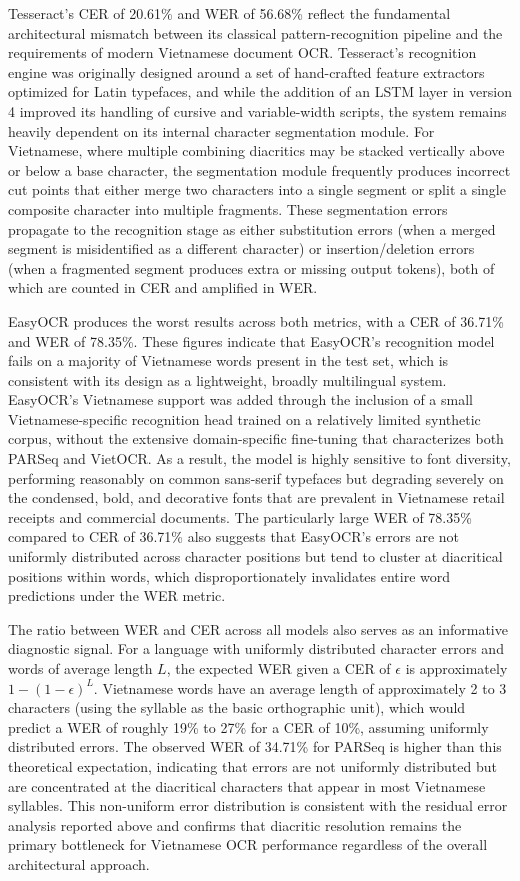 Tesseract's CER of 20.61\% and WER of 56.68\% reflect the fundamental architectural mismatch between its classical pattern-recognition pipeline and the requirements of modern Vietnamese document OCR. Tesseract's recognition engine was originally designed around a set of hand-crafted feature extractors optimized for Latin typefaces, and while the addition of an LSTM layer in version 4 improved its handling of cursive and variable-width scripts, the system remains heavily dependent on its internal character segmentation module. For Vietnamese, where multiple combining diacritics may be stacked vertically above or below a base character, the segmentation module frequently produces incorrect cut points that either merge two characters into a single segment or split a single composite character into multiple fragments. These segmentation errors propagate to the recognition stage as either substitution errors (when a merged segment is misidentified as a different character) or insertion/deletion errors (when a fragmented segment produces extra or missing output tokens), both of which are counted in CER and amplified in WER.

EasyOCR produces the worst results across both metrics, with a CER of 36.71\% and WER of 78.35\%. These figures indicate that EasyOCR's recognition model fails on a majority of Vietnamese words present in the test set, which is consistent with its design as a lightweight, broadly multilingual system. EasyOCR's Vietnamese support was added through the inclusion of a small Vietnamese-specific recognition head trained on a relatively limited synthetic corpus, without the extensive domain-specific fine-tuning that characterizes both PARSeq and VietOCR. As a result, the model is highly sensitive to font diversity, performing reasonably on common sans-serif typefaces but degrading severely on the condensed, bold, and decorative fonts that are prevalent in Vietnamese retail receipts and commercial documents. The particularly large WER of 78.35\% compared to CER of 36.71\% also suggests that EasyOCR's errors are not uniformly distributed across character positions but tend to cluster at diacritical positions within words, which disproportionately invalidates entire word predictions under the WER metric.

The ratio between WER and CER across all models also serves as an informative diagnostic signal. For a language with uniformly distributed character errors and words of average length $L$, the expected WER given a CER of $\epsilon$ is approximately $1 - (1 - \epsilon)^L$. Vietnamese words have an average length of approximately 2 to 3 characters (using the syllable as the basic orthographic unit), which would predict a WER of roughly 19\% to 27\% for a CER of 10\%, assuming uniformly distributed errors. The observed WER of 34.71\% for PARSeq is higher than this theoretical expectation, indicating that errors are not uniformly distributed but are concentrated at the diacritical characters that appear in most Vietnamese syllables. This non-uniform error distribution is consistent with the residual error analysis reported above and confirms that diacritic resolution remains the primary bottleneck for Vietnamese OCR performance regardless of the overall architectural approach.


